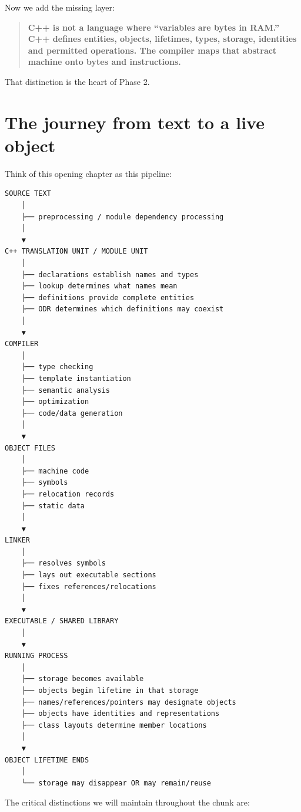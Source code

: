 Now we add the missing layer:

\begin{quote}
\textbf{C++ is not a language where ``variables are bytes in RAM.'' C++ defines entities, objects, lifetimes, types, storage, identities and permitted operations. The compiler maps that abstract machine onto bytes and instructions.}
\end{quote}

That distinction is the heart of Phase 2.

\section{The journey from text to a live object}\label{01-foundations-i-ch002-the-journey-from-text-to-a-live-object}

\hypertarget{01-foundations-i-ch002-the-journey-from-text-to-a-live-object}{}

Think of this opening chapter as this pipeline:

\begin{verbatim}
SOURCE TEXT
    │
    ├── preprocessing / module dependency processing
    │
    ▼
C++ TRANSLATION UNIT / MODULE UNIT
    │
    ├── declarations establish names and types
    ├── lookup determines what names mean
    ├── definitions provide complete entities
    ├── ODR determines which definitions may coexist
    │
    ▼
COMPILER
    │
    ├── type checking
    ├── template instantiation
    ├── semantic analysis
    ├── optimization
    ├── code/data generation
    │
    ▼
OBJECT FILES
    │
    ├── machine code
    ├── symbols
    ├── relocation records
    ├── static data
    │
    ▼
LINKER
    │
    ├── resolves symbols
    ├── lays out executable sections
    ├── fixes references/relocations
    │
    ▼
EXECUTABLE / SHARED LIBRARY
    │
    ▼
RUNNING PROCESS
    │
    ├── storage becomes available
    ├── objects begin lifetime in that storage
    ├── names/references/pointers may designate objects
    ├── objects have identities and representations
    ├── class layouts determine member locations
    │
    ▼
OBJECT LIFETIME ENDS
    │
    └── storage may disappear OR may remain/reuse
\end{verbatim}

The critical distinctions we will maintain throughout the chunk are:

